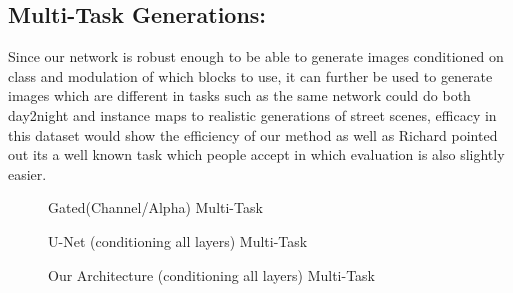 \documentclass[10pt,twocolumn,letterpaper]{article}
\begin{document}
\subsection{Multi-Task Generations: }
Since our network is robust enough to be able to generate images conditioned on class and modulation of which blocks to use, it can further be used to generate images which are different in tasks such as the same network could do both day2night and instance maps to realistic generations of street scenes, efficacy in this dataset would show the efficiency of our method as well as Richard pointed out its a well known task which people accept in which evaluation is also slightly easier.


\begin{figure}%
    \centering
    \caption{Gated(Channel/Alpha) Multi-Task}
    \label{fig:channel_gated_multi-task}
    \vspace{-3mm}
\end{figure}

\begin{figure}%
    \centering
    \caption{U-Net (conditioning all layers) Multi-Task}
    \label{fig:channel_gated_multi-task}
    \vspace{-3mm}
\end{figure}

\begin{figure}%
    \centering
    \caption{Our Architecture (conditioning all layers) Multi-Task}
    \label{fig:channel_gated_multi-task}
    \vspace{-3mm}
\end{figure}
\end{document}
